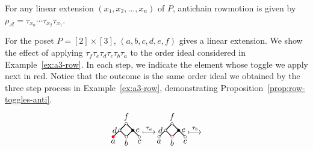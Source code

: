 \documentclass[ALCO,ThmDefs,Unicode,epreuves]{cedram}
\newcommand\rowm{\rho}
\newcommand\rowA{\rowm_{\mathcal{A}}}
\begin{document}
\begin{prop}\label{prop:row-toggles-anti}
For any linear extension $(x_1,x_2,\dots,x_n)$ of $P$, antichain rowmotion is given by
$\rowA = \tau_{x_n} \cdots \tau_{x_2} \tau_{x_1}$.
\end{prop}

\begin{exam}\label{ex:row-toggles-anti}
For the poset
$P=[2]\times[3]$, $(a,b,c,d,e,f)$ gives a linear extension.
We show the effect of applying $\tau_f \tau_e \tau_d \tau_c \tau_b \tau_a$ to the order ideal considered in Example~\ref{ex:a3-row}.
In each step, we indicate the element whose toggle we apply next in {\color{red}red}.
Notice that the outcome is the same order ideal we obtained by the three step process in Example~\ref{ex:a3-row}, demonstrating Proposition~\ref{prop:row-toggles-anti}.
\[
\begin{tikzpicture}[scale=0.274]
\begin{scope}[shift={(0,-4)}]
\draw[thick] (-0.1, 1.9) -- (-0.9, 1.1);
\draw[thick] (0.1, 1.9) -- (0.9, 1.1);
\draw[thick] (-1.1, 0.9) -- (-1.9, 0.1);
\draw[thick] (-0.9, 0.9) -- (-0.1, 0.1);
\draw[thick] (0.9, 0.9) -- (0.1, 0.1);
\draw[thick] (1.1, 0.9) -- (1.9, 0.1);
\draw (0,2) circle [radius=0.2];
\draw (-1,1) circle [radius=0.2];
\draw[fill] (1,1) circle [radius=0.2];
\draw[red,fill] (-2,0) circle [radius=0.2];
\draw (0,0) circle [radius=0.2];
\draw (2,0) circle [radius=0.2];
\node[above] at (0,2) {$f$};
\node[left] at (-1,1) {$d$};
\node[right] at (1,1) {$e$};
\node[below] at (-2,0) {$a$};
\node[below] at (0,0) {$b$};
\node[below] at (2,0) {$c$};
\end{scope}
\node at (3.5,-3) {$\stackrel{\tau_a}{\longmapsto}$};
\begin{scope}[shift={(7,-4)}]
\draw[thick] (-0.1, 1.9) -- (-0.9, 1.1);
\draw[thick] (0.1, 1.9) -- (0.9, 1.1);
\draw[thick] (-1.1, 0.9) -- (-1.9, 0.1);
\draw[thick] (-0.9, 0.9) -- (-0.1, 0.1);
\draw[thick] (0.9, 0.9) -- (0.1, 0.1);
\draw[thick] (1.1, 0.9) -- (1.9, 0.1);
\draw (0,2) circle [radius=0.2];
\draw (-1,1) circle [radius=0.2];
\draw[fill] (1,1) circle [radius=0.2];
\draw (-2,0) circle [radius=0.2];
\draw[red] (0,0) circle [radius=0.2];
\draw (2,0) circle [radius=0.2];
\node[above] at (0,2) {$f$};
\node[left] at (-1,1) {$d$};
\node[right] at (1,1) {$e$};
\node[below] at (-2,0) {$a$};
\node[below] at (0,0) {$b$};
\node[below] at (2,0) {$c$};
\end{scope}
\node at (10.5,-3) {$\stackrel{\tau_b}{\longmapsto}$};

\end{tikzpicture}\]
\end{exam}
\end{document}
